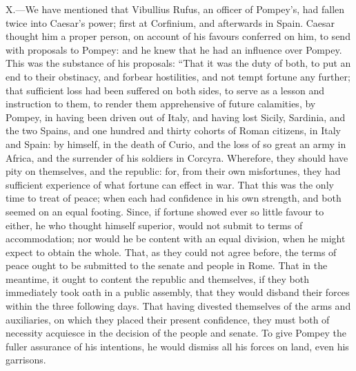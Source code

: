 X.—We have mentioned that Vibullius Rufus, an officer of Pompey's, had
fallen twice into Caesar's power; first at Corfinium, and afterwards in
Spain. Caesar thought him a proper person, on account of his favours
conferred on him, to send with proposals to Pompey: and he knew that he
had an influence over Pompey. This was the substance of his proposals:
``That it was the duty of both, to put an end to their obstinacy, and
forbear hostilities, and not tempt fortune any further; that sufficient
loss had been suffered on both sides, to serve as a lesson and
instruction to them, to render them apprehensive of future calamities,
by Pompey, in having been driven out of Italy, and having lost Sicily,
Sardinia, and the two Spains, and one hundred and thirty cohorts of
Roman citizens, in Italy and Spain: by himself, in the death of Curio,
and the loss of so great an army in Africa, and the surrender of his
soldiers in Corcyra. Wherefore, they should have pity on themselves, and
the republic: for, from their own misfortunes, they had sufficient
experience of what fortune can effect in war. That this was the only
time to treat of peace; when each had confidence in his own strength,
and both seemed on an equal footing. Since, if fortune showed ever so
little favour to either, he who thought himself superior, would not
submit to terms of accommodation; nor would he be content with an equal
division, when he might expect to obtain the whole. That, as they could
not agree before, the terms of peace ought to be submitted to the senate
and people in Rome. That in the meantime, it ought to content the
republic and themselves, if they both immediately took oath in a public
assembly, that they would disband their forces within the three
following days. That having divested themselves of the arms and
auxiliaries, on which they placed their present confidence, they must
both of necessity acquiesce in the decision of the people and senate. To
give Pompey the fuller assurance of his intentions, he would dismiss all
his forces on land, even his garrisons.

